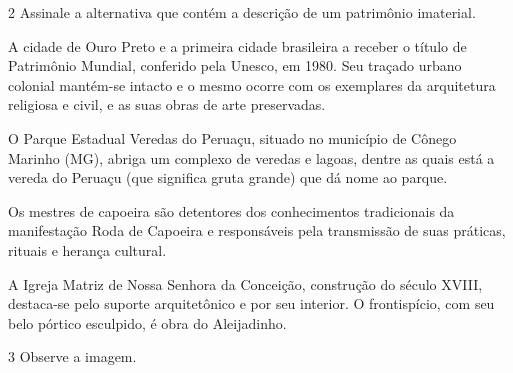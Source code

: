 
\num{2}  Assinale a alternativa que contém a descrição de um patrimônio imaterial.

\begin{escolha}
\item
  A cidade de Ouro Preto e a primeira cidade brasileira a receber o
  título de Patrimônio Mundial, conferido pela Unesco, em 1980. Seu
  traçado urbano colonial mantém-se intacto e o mesmo ocorre com os
  exemplares da arquitetura religiosa e civil, e as suas obras de arte
  preservadas.
\item
  O Parque Estadual Veredas do Peruaçu, situado no município de Cônego
  Marinho (MG), abriga um complexo de veredas e lagoas, dentre as quais
  está a vereda do Peruaçu (que significa gruta grande) que dá nome ao
  parque.
\item
  Os mestres de capoeira são detentores dos conhecimentos tradicionais
  da manifestação Roda de Capoeira e responsáveis pela transmissão de
  suas práticas, rituais e herança cultural.
\item
  A Igreja Matriz de Nossa Senhora da Conceição, construção do século
  XVIII, destaca-se pelo suporte arquitetônico e por seu interior. O
  frontispício, com seu belo pórtico esculpido, é obra do Aleijadinho.
\end{escolha}



\pagebreak
\num{3}  Observe a imagem.

